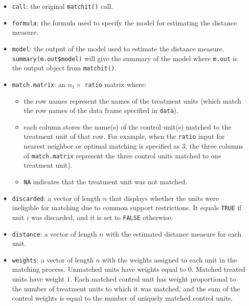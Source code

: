 \begin{itemize}
\item \texttt{call}: the original {\tt matchit()} call.
  
\item \texttt{formula}: the formula used to specify the model for
  estimating the distance measure.
  
\item \texttt{model}: the output of the model used to estimate
  the distance measure.  \texttt{summary(m.out\$model)} will give the
  summary of the model where \texttt{m.out} is the output object from
  \texttt{matchit()}.
  
\item \texttt{match.matrix}: an $n_1 \times$ \texttt{ratio} matrix
  where:
  \begin{itemize}
  \item the row names represent the names of the treatment units
    (which match the row names of the data frame specified in
    \texttt{data}).
  \item each column stores the name(s) of the control unit(s) matched
    to the treatment unit of that row. For example, when the
    \texttt{ratio} input for nearest neighbor or optimal matching is
    specified as 3, the three columns of \texttt{match.matrix}
    represent the three control units matched to one treatment unit).
  \item \texttt{NA} indicates that the treatment unit was not matched.
  \end{itemize}
  
\item \texttt{discarded}: a vector of length $n$ that displays whether
  the units were ineligible for matching due to common support
  restrictions.  It equals \texttt{TRUE} if unit $i$ was discarded,
  and it is set to \texttt{FALSE} otherwise.
  
\item \texttt{distance}: a vector of length $n$ with the estimated
  distance measure for each unit.
  
\item \texttt{weights}: a vector of length $n$ with the weights
  assigned to each unit in the matching process.  Unmatched units have
  weights equal to $0$. Matched treated units have weight $1$.  Each
  matched control unit has weight proportional to the number of
  treatment units to which it was matched, and the sum of the control
  weights is equal to the number of uniquely matched control units.
 

\end{itemize}
